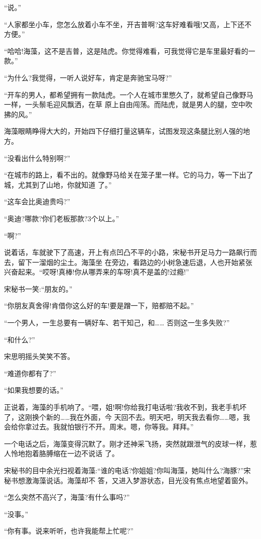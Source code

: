 \documentclass[11pt,a4paper,onecolumn]{article}
\begin{document}
``说。''

``人家都坐小车，您怎么放着小车不坐，开吉普啊?这车好难看哦!又高，上下还不方便。''

``哈哈!海藻，这不是吉普，这是陆虎。你觉得难看，可我觉得它是车里最好看的一款。''

``为什么?我觉得，一听人说好车，肯定是奔驰宝马呀?''

``开车的男人，都希望拥有一款陆虎。一个人在城市里憋久了，就希望自己像野马一样，一头鬃毛迎风飘洒，在草
原上自由闯荡。而陆虎，就是男人的腿，空中吹拂的风。''

海藻眼睛睁得大大的，开始四下仔细打量这辆车，试图发现这条腿比别人强的地方。

``没看出什么特别啊?''

``在城市的路上，看不出的。就像野马给关在笼子里一样。它的马力，等一下出了城，尤其到了山地，你就知道
了。''

``这车会比奥迪贵吗?''

``奥迪?哪款?你们老板那款?3个以上。''

``啊?''

说着话，车就驶下了高速，开上有点凹凸不平的小路，宋秘书开足马力一路飙行而去，留下一溜烟的尘土。海藻坐
在旁边，看路边的小树急速后退，人也开始紧张兴奋起来。``哎呀!真棒!你从哪弄来的车呀!真不是盖的!过瘾!''

宋秘书一笑:``朋友的。''

``你朋友真舍得!肯借你这么好的车!要是蹭一下，赔都赔不起。''

``一个男人，一生总要有一辆好车、若干知己，和…… 否则这一生多失败?''

``和什么?''

宋思明摇头笑笑不答。

``难道你都有了?''

``如果我想要的话。''

正说着，海藻的手机响了。``喂，姐!啊!你给我打电话啦?我收不到，我老手机坏了，这刚换个新的……我在外面，今
天回不去。明天吧，明天我去看你……嗯，我会给你拿过去。我就怕银行不开。周末。嗯，你等我。拜拜。''

一个电话之后，海藻变得沉默了。刚才还神采飞扬，突然就跟泄气的皮球一样，惹人怜地抱着胳膊缩在一边不说话
了。

宋秘书的目中余光扫视着海藻:``谁的电话?你姐姐?你叫海藻，她叫什么?海豚?''宋秘书想激海藻说话。海藻却不
答，又进入梦游状态，目光没有焦点地望着窗外。

``怎么突然不高兴了，海藻?有什么事吗?''

``没事。''

``你有事。说来听听，也许我能帮上忙呢?''
\end{document}
